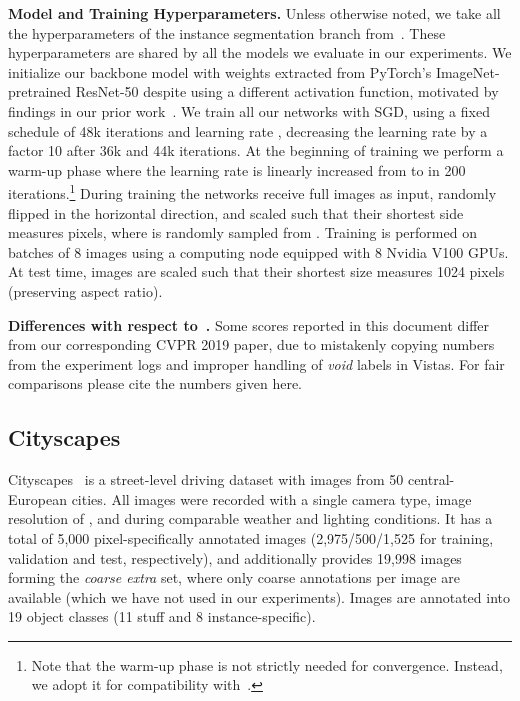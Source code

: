 \documentclass[10pt,twocolumn,letterpaper]{article}
\renewcommand{\paragraph}[1]{
        \vspace{3pt}
	\noindent\textbf{#1}}
\begin{document}
\paragraph{Model and Training Hyperparameters.}
Unless otherwise noted, we take all the hyperparameters of the instance segmentation branch from~\cite{He2017}. These hyperparameters are shared by all the models we evaluate in our experiments.
We initialize our backbone model with weights extracted from PyTorch's ImageNet-pretrained ResNet-50 despite using a different activation function, motivated by findings in our prior work~\cite{RotPorKon18a}. We train all our networks with SGD, using a fixed schedule of 48k iterations and learning rate , decreasing the learning rate by a factor 10 after 36k and 44k iterations.
At the beginning of training we perform a warm-up phase where the learning rate is linearly increased from  to  in 200 iterations.\footnote{Note that the warm-up phase is not strictly needed for convergence. Instead, we adopt it for compatibility with~\cite{He2017}.}
During training the networks receive full images as input, randomly flipped in the horizontal direction, and scaled such that their shortest side measures  pixels, where  is randomly sampled from . Training is performed on batches of 8 images using a computing node equipped with 8 Nvidia V100 GPUs. At test time, images are scaled such that their shortest size measures 1024 pixels (preserving aspect ratio).


\paragraph{Differences with respect to~\cite{Por+19_cvpr}.}
Some scores reported in this document differ from our corresponding CVPR 2019 paper, due to mistakenly copying numbers from the experiment logs and improper handling of \textit{void} labels in Vistas. For fair comparisons please cite the numbers given here.



\subsection{Cityscapes}
\label{ssec:Cityscpes}
Cityscapes~\cite{Cordts2016} is a street-level driving dataset with images from 50 central-European cities. All images were recorded with a single camera type, image resolution of , and during comparable weather and lighting conditions. It has a total of 5,000 pixel-specifically annotated images (2,975/500/1,525 for training, validation and test, respectively), and additionally provides 19,998 images forming the \textit{coarse extra} set, where only coarse annotations per image are available (which we have not used in our experiments). Images are annotated into 19 object classes (11 stuff and 8 instance-specific). 
\end{document}
